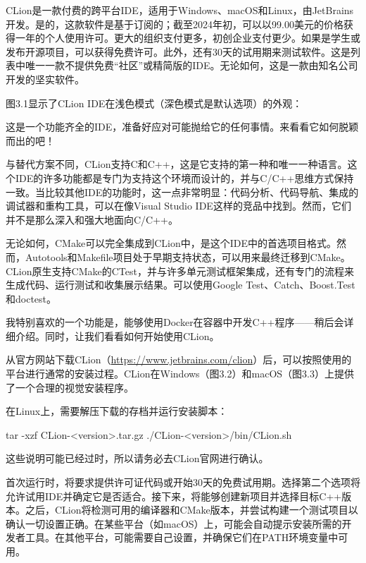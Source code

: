 
CLion是一款付费的跨平台IDE，适用于Windows、macOS和Linux，由JetBrains开发。是的，这款软件是基于订阅的；截至2024年初，可以以99.00美元的价格获得一年的个人使用许可。更大的组织支付更多，初创企业支付更少。如果是学生或发布开源项目，可以获得免费许可。此外，还有30天的试用期来测试软件。这是列表中唯一一款不提供免费“社区”或精简版的IDE。无论如何，这是一款由知名公司开发的坚实软件。

图3.1显示了CLion IDE在浅色模式（深色模式是默认选项）的外观：


这是一个功能齐全的IDE，准备好应对可能抛给它的任何事情。来看看它如何脱颖而出的吧！


与替代方案不同，CLion支持C和C++，这是它支持的第一种和唯一一种语言。这个IDE的许多功能都是专门为支持这个环境而设计的，并与C/C++思维方式保持一致。当比较其他IDE的功能时，这一点非常明显：代码分析、代码导航、集成的调试器和重构工具，可以在像Visual Studio IDE这样的竞品中找到。然而，它们并不是那么深入和强大地面向C/C++。

无论如何，CMake可以完全集成到CLion中，是这个IDE中的首选项目格式。然而，Autotools和Makefile项目处于早期支持状态，可以用来最终迁移到CMake。CLion原生支持CMake的CTest，并与许多单元测试框架集成，还有专门的流程来生成代码、运行测试和收集展示结果。可以使用Google Test、Catch、Boost.Test和doctest。

我特别喜欢的一个功能是，能够使用Docker在容器中开发C++程序——稍后会详细介绍。同时，让我们看看如何开始使用CLion。


从官方网站下载CLion（\url{https://www.jetbrains.com/clion}）后，可以按照使用的平台进行通常的安装过程。CLion在Windows（图3.2）和macOS（图3.3）上提供了一个合理的视觉安装程序。



在Linux上，需要解压下载的存档并运行安装脚本：

\begin{shell}
tar -xzf CLion-<version>.tar.gz
./CLion-<version>/bin/CLion.sh
\end{shell}

这些说明可能已经过时，所以请务必去CLion官网进行确认。

首次运行时，将要求提供许可证代码或开始30天的免费试用期。选择第二个选项将允许试用IDE并确定它是否适合。接下来，将能够创建新项目并选择目标C++版本。之后，CLion将检测可用的编译器和CMake版本，并尝试构建一个测试项目以确认一切设置正确。在某些平台（如macOS）上，可能会自动提示安装所需的开发者工具。在其他平台，可能需要自己设置，并确保它们在PATH环境变量中可用。

